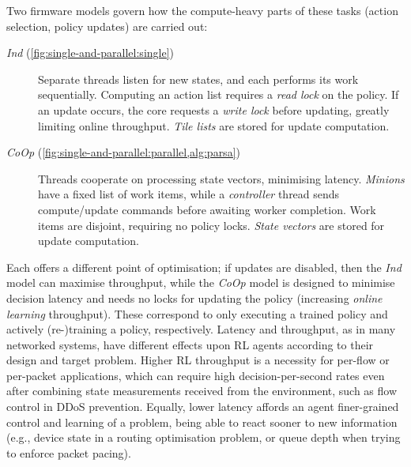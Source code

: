 \documentclass[
sigconf,natbib=false
]{acmart}
\newcommand{\Coopfw}{\emph{CoOp}}
\newcommand{\coopfw}{\Coopfw}
\newcommand{\Indfw}{\emph{Ind}}
\newcommand{\indfw}{\Indfw}
\begin{document}
Two firmware models govern how the compute-heavy parts of these tasks (action selection, policy updates) are carried out:
\begin{description}
	\item[\Indfw{} (\cref{fig:single-and-parallel:single})] Separate threads listen for new states, and each performs its work sequentially. Computing an action list requires a \emph{read lock} on the policy. If an update occurs, the core requests a \emph{write lock} before updating, greatly limiting online throughput. \emph{Tile lists} are stored for update computation.
	\item[\Coopfw{} (\cref{fig:single-and-parallel:parallel,alg:parsa})] Threads cooperate on processing state vectors, minimising latency. \emph{Minions} have a fixed list of work items, while a \emph{controller} thread sends compute/update commands before awaiting worker completion. Work items are disjoint, requiring no policy locks. \emph{State vectors} are stored for update computation.
\end{description}
Each offers a different point of optimisation; if updates are disabled, then the \indfw{} model can maximise throughput, while the \coopfw{} model is designed to minimise decision latency and needs no locks for updating the policy (increasing \emph{online learning} throughput).
These correspond to only executing a trained policy and actively (re-)training a policy, respectively.
Latency and throughput, as in many networked systems, have different effects upon RL agents according to their design and target problem.
Higher RL throughput is a necessity for per-flow or per-packet applications, which can require high decision-per-second rates even after combining state measurements received from the environment, such as flow control in DDoS prevention.
Equally, lower latency affords an agent finer-grained control and learning of a problem, being able to react sooner to new information (e.g., device state in a routing optimisation problem, or queue depth when trying to enforce packet pacing).
\end{document}
